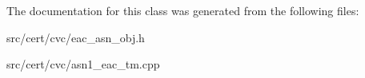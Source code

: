 The documentation for this class was generated from the following files\-:\begin{DoxyCompactItemize}
\item 
src/cert/cvc/eac\-\_\-asn\-\_\-obj.\-h\item 
src/cert/cvc/asn1\-\_\-eac\-\_\-tm.\-cpp\end{DoxyCompactItemize}
